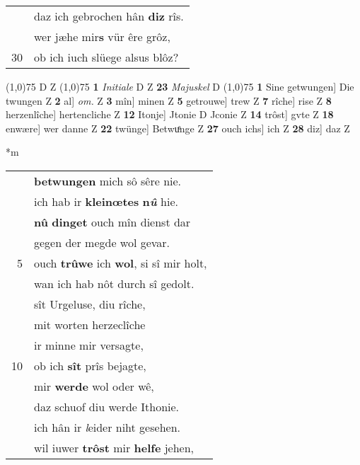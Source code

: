 \documentclass[8pt,a4paper,notitlepage]{article}
\begin{document}
\begin{table}[ht]
\begin{minipage}[t]{0.5\linewidth}
\begin{tabular}{rl}
 & daz ich gebrochen hân \textbf{diz} rîs.\\ 
 & wer jæhe mir\textbf{s} vür êre grôz,\\ 
30 & ob ich iuch slüege alsus blôz?\\ 
\end{tabular}
\scriptsize
\line(1,0){75} \newline
D Z \newline
\line(1,0){75} \newline
\textbf{1} \textit{Initiale} D Z  \textbf{23} \textit{Majuskel} D  \newline
\line(1,0){75} \newline
\textbf{1} Sine getwungen] Die twungen Z \textbf{2} al] \textit{om.} Z \textbf{3} mîn] minen Z \textbf{5} getrouwe] trew Z \textbf{7} rîche] rise Z \textbf{8} herzenlîche] hertencliche Z \textbf{12} Itonje] Jtonie D Jconie Z \textbf{14} trôst] gvte Z \textbf{18} enwære] wer danne Z \textbf{22} twünge] Betwuͤnge Z \textbf{27} ouch ichs] ich Z \textbf{28} diz] daz Z \newline
\end{minipage}
\hspace{0.5cm}
\begin{minipage}[t]{0.5\linewidth}
\small
\begin{center}*m
\end{center}
\begin{tabular}{rl}
 & \textbf{betwungen} mich sô sêre nie.\\ 
 & ich hab ir \textbf{kleinœtes} \textbf{n\textit{û}} hie.\\ 
 & \textbf{nû} \textbf{dinget} ouch mîn dienst dar\\ 
 & gegen der megde wol gevar.\\ 
5 & ouch \textbf{trûwe} ich \textbf{wol}, si sî mir holt,\\ 
 & wan ich hab nôt durch sî gedolt.\\ 
 & sît Urgeluse, diu rîche,\\ 
 & mit worten herzeclîche\\ 
 & ir minne mir versagte,\\ 
10 & ob ich \textbf{sît} prîs bejagte,\\ 
 & mir \textbf{werde} wol oder wê,\\ 
 & daz schuof diu werde Ithonie.\\ 
 & ich hân ir \textit{l}eider niht gesehen.\\ 
 & wil iuwer \textbf{trôst} mir \textbf{helfe} jehen,\\ 

\end{tabular}
\end{minipage}
\end{table}
\end{document}
